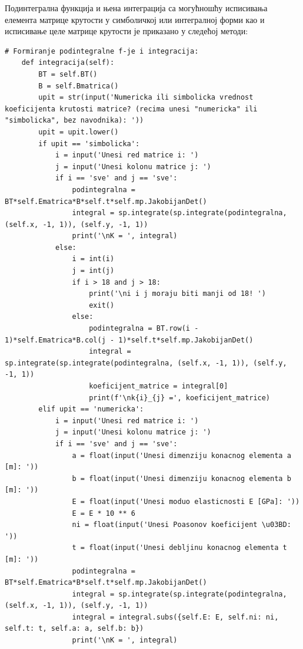 \documentclass[11pt, a4paper]{article}
\begin{document}
Подинтегрална функција и њена интеграција са могућношћу исписивања елемента матрице крутости у симболичкој или интегралној форми као и исписивање целе матрице крутости је приказано у следећој методи:
\begin{lstlisting}
# Formiranje podintegralne f-je i integracija:
    def integracija(self):
        BT = self.BT()
        B = self.Bmatrica()
        upit = str(input('Numericka ili simbolicka vrednost koeficijenta krutosti matrice? (recima unesi "numericka" ili "simbolicka", bez navodnika): '))
        upit = upit.lower()
        if upit == 'simbolicka':
            i = input('Unesi red matrice i: ')
            j = input('Unesi kolonu matrice j: ')
            if i == 'sve' and j == 'sve':
                podintegralna = BT*self.Ematrica*B*self.t*self.mp.JakobijanDet()
                integral = sp.integrate(sp.integrate(podintegralna, (self.x, -1, 1)), (self.y, -1, 1))
                print('\nK = ', integral)
            else:
                i = int(i)
                j = int(j)
                if i > 18 and j > 18:
                    print('\ni i j moraju biti manji od 18! ')
                    exit()
                else:
                    podintegralna = BT.row(i - 1)*self.Ematrica*B.col(j - 1)*self.t*self.mp.JakobijanDet()
                    integral = sp.integrate(sp.integrate(podintegralna, (self.x, -1, 1)), (self.y, -1, 1))
                    koeficijent_matrice = integral[0]
                    print(f'\nk{i}_{j} =', koeficijent_matrice)
        elif upit == 'numericka':
            i = input('Unesi red matrice i: ')
            j = input('Unesi kolonu matrice j: ')
            if i == 'sve' and j == 'sve':
                a = float(input('Unesi dimenziju konacnog elementa a [m]: '))
                b = float(input('Unesi dimenziju konacnog elementa b [m]: '))
                E = float(input('Unesi moduo elasticnosti E [GPa]: '))
                E = E * 10 ** 6
                ni = float(input('Unesi Poasonov koeficijent \u03BD: '))
                t = float(input('Unesi debljinu konacnog elementa t [m]: '))
                podintegralna = BT*self.Ematrica*B*self.t*self.mp.JakobijanDet()
                integral = sp.integrate(sp.integrate(podintegralna, (self.x, -1, 1)), (self.y, -1, 1))
                integral = integral.subs({self.E: E, self.ni: ni, self.t: t, self.a: a, self.b: b})
                print('\nK = ', integral)


\end{lstlisting}
\end{document}
